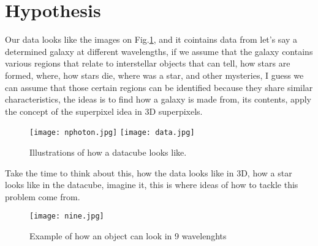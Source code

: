 \documentclass[11pt,fleqn]{book} %
\begin{document}
																				     \section{Hypothesis}
																				     Our data looks like the images on Fig.\ref{fig:cubes}, and it cointains data from let's say a determined galaxy at different wavelengths, if we assume that the galaxy contains various regions that relate to interstellar objects that can tell, how stars are formed, where, how stars die, where was a star, and other mysteries, I guess we can assume that those certain regions can be identified because they share similar characteristics, the ideas is to find how a galaxy is made from, its contents, apply the concept of the superpixel idea in 3D superpixels. 
																				     \begin{figure}[h]
																				     	\centering
																					    \texttt{[image: nphoton.jpg]}\hspace{1cm}
																					        \texttt{[image: data.jpg]}
																						    \caption{Illustrations of how a datacube looks like.}
																						        \label{fig:cubes}
																							\end{figure}

																							Take the time to think about this, how the data looks like in 3D, how a star looks like in the datacube, imagine it, this is where ideas of how to tackle this problem come from.
																							\begin{figure}
																								\centering
																								    \texttt{[image: nine.jpg]}
																								        \caption{Example of how an object can look in 9 wavelenghts}
																									    \label{fig:nine}
																									    \end{figure}
\end{document}
